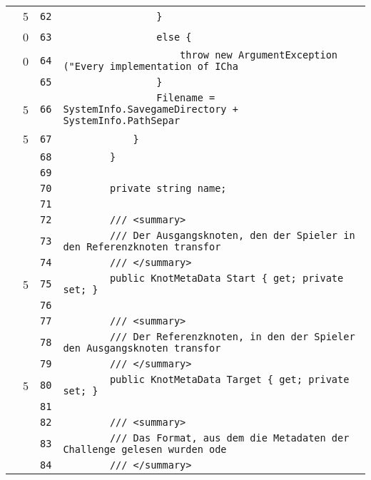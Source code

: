 \documentclass[a4paper,10pt]{article}
\begin{document}
\begin{longtable}[l]{lrrl}
\cellcolor{green} & 5 & \verb~62~ & \verb~                }~\\
\cellcolor{red} & 0 & \verb~63~ & \verb~                else {~\\
\cellcolor{red} & 0 & \verb~64~ & \verb~                    throw new ArgumentException ("Every implementation of ICha~\\
\cellcolor{gray} &  & \verb~65~ & \verb~                }~\\
\cellcolor{green} & 5 & \verb~66~ & \verb~                Filename = SystemInfo.SavegameDirectory + SystemInfo.PathSepar~\\
\cellcolor{green} & 5 & \verb~67~ & \verb~            }~\\
\cellcolor{gray} &  & \verb~68~ & \verb~        }~\\
\cellcolor{gray} &  & \verb~69~ & \verb~~\\
\cellcolor{gray} &  & \verb~70~ & \verb~        private string name;~\\
\cellcolor{gray} &  & \verb~71~ & \verb~~\\
\cellcolor{gray} &  & \verb~72~ & \verb~        /// <summary>~\\
\cellcolor{gray} &  & \verb~73~ & \verb~        /// Der Ausgangsknoten, den der Spieler in den Referenzknoten transfor~\\
\cellcolor{gray} &  & \verb~74~ & \verb~        /// </summary>~\\
\cellcolor{green} & 5 & \verb~75~ & \verb~        public KnotMetaData Start { get; private set; }~\\
\cellcolor{gray} &  & \verb~76~ & \verb~~\\
\cellcolor{gray} &  & \verb~77~ & \verb~        /// <summary>~\\
\cellcolor{gray} &  & \verb~78~ & \verb~        /// Der Referenzknoten, in den der Spieler den Ausgangsknoten transfor~\\
\cellcolor{gray} &  & \verb~79~ & \verb~        /// </summary>~\\
\cellcolor{green} & 5 & \verb~80~ & \verb~        public KnotMetaData Target { get; private set; }~\\
\cellcolor{gray} &  & \verb~81~ & \verb~~\\
\cellcolor{gray} &  & \verb~82~ & \verb~        /// <summary>~\\
\cellcolor{gray} &  & \verb~83~ & \verb~        /// Das Format, aus dem die Metadaten der Challenge gelesen wurden ode~\\
\cellcolor{gray} &  & \verb~84~ & \verb~        /// </summary>~\\

\end{longtable}
\end{document}
